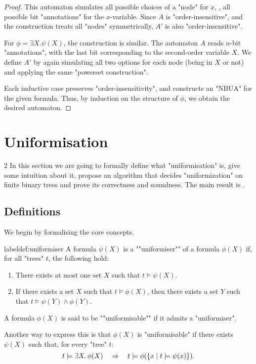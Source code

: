 \documentclass[a4paper,UKenglish,cleveref, autoref, thm-restate]{lipics-v2021}
\begin{document}
\begin{proof}
	This automaton simulates all possible choices of a "node" for $x$, \ie, all possible  bit "annotations" for the $x$-variable.
	Since $A$ is "order-insensitive", and the construction treats all "nodes" symmetrically, $A'$ is also "order-insensitive".

	For $\phi = \exists X.\psi(X)$, the construction is similar. The automaton $A$ reads $n$-bit "annotations", with the last bit corresponding
	to the second-order variable $X$. We define $A'$ by again simulating all two options for each node (being in $X$ or not) and applying the same
	"powerset construction".

	Each inductive case preserves "order-insensitivity", and constructs an "NBUA" for the given formula. Thus, by induction on the structure of $\phi$,
	we obtain the desired automaton.
\end{proof}


\section{Uniformisation}\label{sec:uniformisation}
 2
In this section we are going to formally define what "uniformisation" is, give some intuition about it,
propose an algorithm that decides "uniformization" on finite binary trees and prove its correctness and soundness.
The main result is .

\subsection{Definitions}

We begin by formalising the core concepts.

\begin{definition}label{def:uniformiser}
	\AP A formula $\psi(X)$ is a ""uniformiser"" of a formula $\phi(X)$ if, for all "trees" $t$, the following hold:
	\begin{enumerate}
		\item There exists at most one set $X$ such that $t \models \psi(X)$.
		\item If there exists a set $X$ such that $t \models \phi(X)$, then there exists a set $Y$ such that $t \models \psi(Y) \land \phi(Y)$.
	\end{enumerate}
\end{definition}

\AP A formula $\phi(X)$ is said to be ""uniformisable"" if it admits a "uniformiser".

Another way to express this is that $\phi(X)$ is "uniformisable" if there exists $\psi(X)$ such that, for every "tree" $t$:
\[
	t \models \exists X.\, \phi(X) \quad \Rightarrow \quad t \models \phi(\left\{x \mid t \models \psi(x)\right\}).
\]
\end{document}

